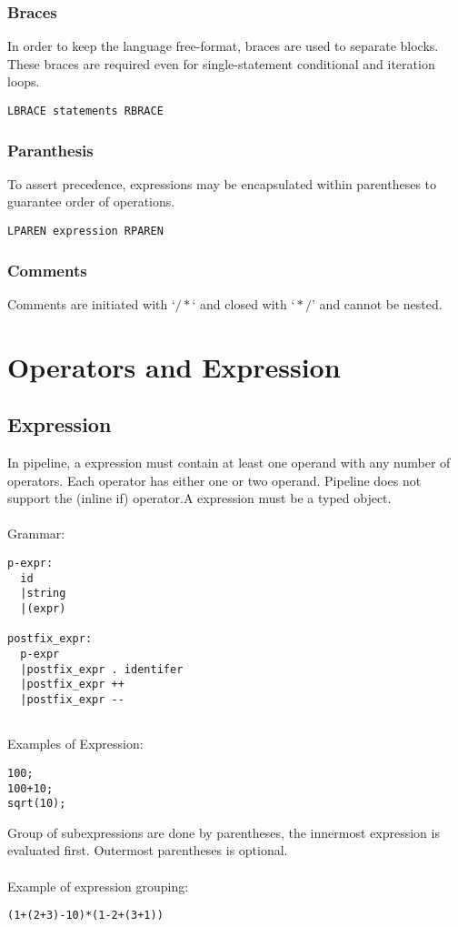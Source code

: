 \documentclass[./LRM_main.tex]{subfiles}
\begin{document}
\subsubsection{Braces}
In order to keep the language free-format, braces are used to separate blocks. These braces are required even for single-statement conditional and iteration loops. 
\begin{lstlisting}
LBRACE statements RBRACE
\end{lstlisting}

\subsubsection{Paranthesis }
To assert precedence, expressions may be encapsulated within parentheses to guarantee order of operations.
\begin{lstlisting}
LPAREN expression RPAREN
\end{lstlisting}

\subsubsection{Comments }
Comments are initiated with $‘/* ‘$ and closed with $‘*/’$ and cannot be nested.
\section{Operators and Expression}
\subsection{Expression}
In pipeline, a expression must contain at least one operand with any number of operators. Each operator has either one or two operand. Pipeline does not support the (inline if) operator.A expression must be a typed object.\\ 
\vspace{1mm}\\
Grammar:
\begin{lstlisting}
p-expr:
  id
  |string
  |(expr)

postfix_expr:
  p-expr
  |postfix_expr . identifer
  |postfix_expr ++
  |postfix_expr --
    
\end{lstlisting}
Examples of Expression:
\begin{lstlisting}
100;
100+10;
sqrt(10);
\end{lstlisting}
\vspace{1 mm}
Group of subexpressions are done by parentheses, the innermost expression is evaluated first. Outermost parentheses is optional.\\
\vspace{1 mm}\\
Example of expression grouping:
\begin{lstlisting}
(1+(2+3)-10)*(1-2+(3+1))
\end{lstlisting}
\end{document}
